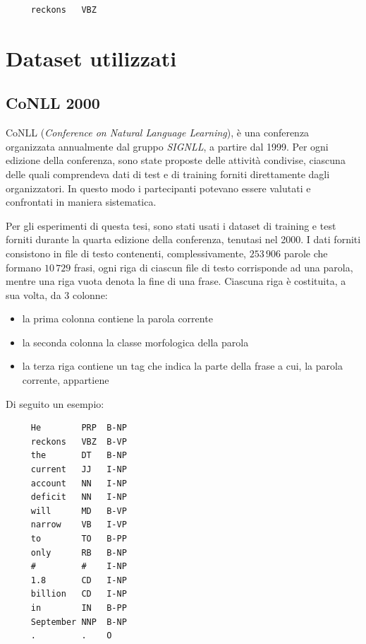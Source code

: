 \begin{center}
  \begin{minipage}{5cm}
    \begin{verbatim}
     reckons   VBZ
    \end{verbatim}
  \end{minipage}
\end{center}

\section{Dataset utilizzati}
\nocite{Zanchetta:2005}
\nocite{Attardi:2008}

\subsection{CoNLL 2000}
CoNLL (\emph{Conference on Natural Language Learning}), \`e una conferenza organizzata annualmente dal gruppo \emph{SIGNLL}, a partire dal 1999.
Per ogni edizione della conferenza, sono state proposte delle attivit\`a condivise, ciascuna delle quali comprendeva dati di test e di training forniti direttamente dagli organizzatori.
In questo modo i partecipanti potevano essere valutati e confrontati in maniera sistematica.

Per gli esperimenti di questa tesi, sono stati usati i dataset di training e test forniti durante la quarta edizione della conferenza, tenutasi nel 2000.
I dati forniti consistono in file di testo contenenti, complessivamente, $253\,906$ parole che formano $10\,729$ frasi, ogni riga di ciascun file di testo corrisponde ad una parola, mentre una riga vuota denota la fine di una frase.
Ciascuna riga \`e costituita, a sua volta, da 3 colonne:
\begin{itemize}
  \item la prima colonna contiene la parola corrente
  \item la seconda colonna la classe morfologica della parola
  \item la terza riga contiene un tag che indica la parte della frase a cui, la parola corrente, appartiene
\end{itemize}

Di seguito un esempio:

\begin{center}
  \begin{minipage}{5cm}
    \begin{verbatim}
     He        PRP  B-NP
     reckons   VBZ  B-VP
     the       DT   B-NP
     current   JJ   I-NP
     account   NN   I-NP
     deficit   NN   I-NP
     will      MD   B-VP
     narrow    VB   I-VP
     to        TO   B-PP
     only      RB   B-NP
     #         #    I-NP
     1.8       CD   I-NP
     billion   CD   I-NP
     in        IN   B-PP
     September NNP  B-NP
     .         .    O
    \end{verbatim}
  \end{minipage}
\end{center}

